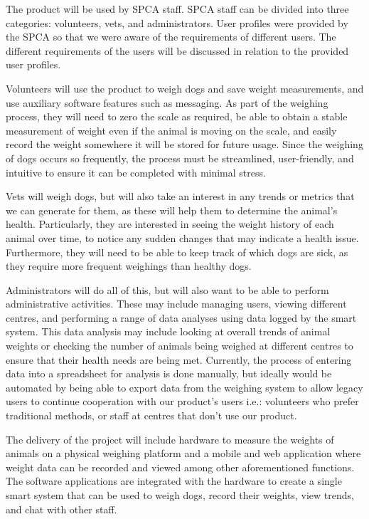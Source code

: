 The product will be used by SPCA staff. SPCA staff can be divided into three categories: volunteers, vets, and administrators. User profiles were provided by the SPCA so that we were aware of the requirements of different users. The different requirements of the users will be discussed in relation to the provided user profiles.

Volunteers will use the product to weigh dogs and save weight measurements, and use auxiliary software features such as messaging. As part of the weighing process, they will need to zero the scale as required, be able to obtain a stable measurement of weight even if the animal is moving on the scale, and easily record the weight somewhere it will be stored for future usage. Since the weighing of dogs occurs so frequently, the process must be streamlined, user-friendly, and intuitive to ensure it can be completed with minimal stress. 

Vets will weigh dogs, but will also take an interest in any trends or metrics that we can generate for them, as these will help them to determine the animal's health. Particularly, they are interested in seeing the weight history of each animal over time, to notice any sudden changes that may indicate a health issue. Furthermore, they will need to be able to keep track of which dogs are sick, as they require more frequent weighings than healthy dogs. 

Administrators will do all of this, but will also want to be able to perform administrative activities. These may include managing users, viewing different centres, and performing a range of data analyses using data logged by the smart system. This data analysis may include looking at overall trends of animal weights or checking the number of animals being weighed at different centres to ensure that their health needs are being met. Currently, the process of entering data into a spreadsheet for analysis is done manually, but ideally would be automated by being able to export data from the weighing system to allow legacy users to continue cooperation with our product’s users i.e.: volunteers who prefer traditional methods, or staff at centres that don’t use our product.

The delivery of the project will include hardware to measure the weights of animals on a physical weighing platform and a mobile and web application where weight data can be recorded and viewed among other aforementioned functions. The software applications are integrated with the hardware to create a single smart system that can be used to weigh dogs, record their weights, view trends, and chat with other staff.

